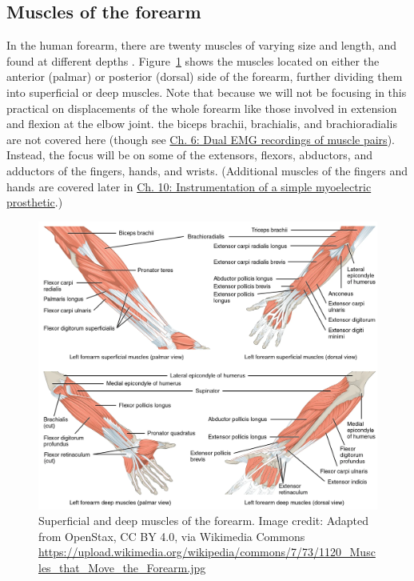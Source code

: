 \documentclass{article}
\begin{document}
\subsection{Muscles of the forearm}

In the human forearm, there are twenty muscles of varying size and length, and found at different depths \citep{openStax_upper, mitchell2023forearm}. Figure~\ref{b2doQoZWdZ} shows the muscles located on either the anterior (palmar) or posterior (dorsal) side of the forearm, further dividing them into superficial or deep muscles. Note that because we will not be focusing in this practical on displacements of the whole forearm like those involved in extension and flexion at the elbow joint. the biceps brachii, brachialis, and brachioradialis are not covered here (though see \href{https://curvenote.com/oxa:EPpXta8zJdzN048lz8AR/pIDHVE4gOQaQL1y9Os3r}{Ch. 6: Dual EMG recordings of muscle pairs}). Instead, the focus will be on some of the extensors, flexors, abductors, and adductors of the fingers, hands, and wrists. (Additional muscles of the fingers and hands are covered later in \href{https://curvenote.com/oxa:EPpXta8zJdzN048lz8AR/Fwnarvyq1j9AlkJ1JWeF}{Ch. 10: Instrumentation of a simple myoelectric prosthetic}.)

\begin{figure}[!htbp]
\centering
\includegraphics[width=0.9\linewidth]{files/EPpXta8zJdzN048lz8AR-150be6c36065bf3970e44f8e481fd96b.png}
\caption[]{Superficial and deep muscles of the forearm. Image credit: Adapted from OpenStax, CC BY 4.0, via Wikimedia Commons \href{https://upload.wikimedia.org/wikipedia/commons/7/73/1120\_Muscles\_that\_Move\_the\_Forearm.jpg}{https://upload.wikimedia.org/wikipedia/commons/7/73/1120\_Muscles\_that\_Move\_the\_Forearm.jpg}}
\label{b2doQoZWdZ}
\end{figure}
\end{document}
